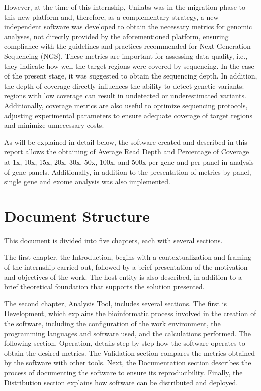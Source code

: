 However, at the time of this internship, Unilabs was in the migration phase to this new platform and, therefore, as a complementary strategy, a new independent software was developed to obtain the necessary metrics for genomic analyses, not directly provided by the aforementioned platform, ensuring compliance with the guidelines and practices recommended for Next Generation Sequencing (NGS). These metrics are important for assessing data quality, i.e., they indicate how well the target regions were covered by sequencing. In the case of the present stage, it was suggested to obtain the sequencing depth. In addition, the depth of coverage directly influences the ability to detect genetic variants: regions with low coverage can result in undetected or underestimated variants. Additionally, coverage metrics are also useful to optimize sequencing protocols, adjusting experimental parameters to ensure adequate coverage of target regions and minimize unnecessary costs. 

As will be explained in detail below, the software created and described in this report allows the obtaining of Average Read Depth and Percentage of Coverage at 1x, 10x, 15x, 20x, 30x, 50x, 100x, and 500x per gene and per panel in analysis of gene panels. Additionally, in addition to the presentation of metrics by panel, single gene and exome analysis was also implemented.

\section{Document Structure}
This document is divided into five chapters, each with several sections. 

The first chapter, the Introduction, begins with a contextualization and framing of the internship carried out, followed by a brief presentation of the motivation and objectives of the work. The host entity is also described, in addition to a brief theoretical foundation that supports the solution presented. 

The second chapter, Analysis Tool, includes several sections. The first is Development, which explains the bioinformatic process involved in the creation of the software, including the configuration of the work environment, the programming languages and software used, and the calculations performed. The following section, Operation, details step-by-step how the software operates to obtain the desired metrics. The Validation section compares the metrics obtained by the software with other tools. Next, the Documentation section describes the process of documenting the software to ensure its reproducibility. Finally, the Distribution section explains how software can be distributed and deployed. 

